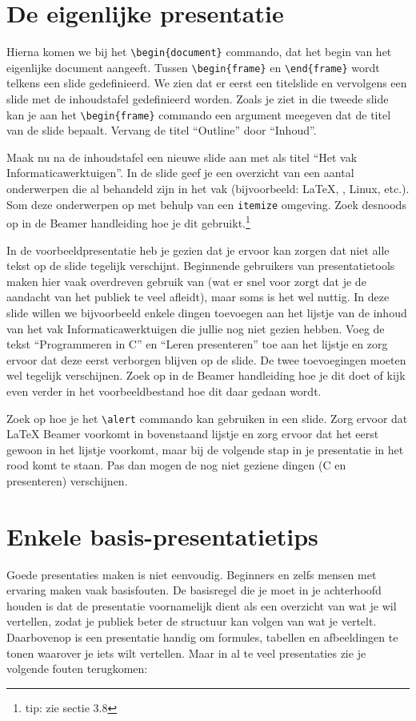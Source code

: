 \documentclass[a4paper,12pt]{article}
\begin{document}
\section{De eigenlijke presentatie}
Hierna komen we bij het \verb~\begin{document}~ commando, dat het
begin van het eigenlijke document aangeeft. Tussen
\verb~\begin{frame}~ en \verb~\end{frame}~ wordt telkens een slide
gedefinieerd. We zien dat er eerst een titelslide en vervolgens een
slide met de inhoudstafel gedefinieerd worden. Zoals je ziet in die
tweede slide kan je aan het \verb~\begin{frame}~ commando een
argument meegeven dat de titel van de slide bepaalt. Vervang de
titel ``Outline'' door ``Inhoud''.

Maak nu na de inhoudstafel een nieuwe slide aan met als titel ``Het
vak Informaticawerktuigen''. In de slide geef je een overzicht van een
aantal onderwerpen die al behandeld zijn in het vak (bijvoorbeeld:
\LaTeX{}, \BibTeX{}, Linux, etc.). Som deze onderwerpen op met
behulp van een \texttt{itemize} omgeving. Zoek desnoods op in de
Beamer handleiding hoe je dit gebruikt.\footnote{tip: zie sectie 3.8}

In de voorbeeldpresentatie heb je gezien dat je ervoor kan zorgen dat
niet alle tekst op de slide tegelijk verschijnt. Beginnende gebruikers
van presentatietools maken hier vaak overdreven gebruik van (wat er
snel voor zorgt dat je de aandacht van het publiek te veel afleidt),
maar soms is het wel nuttig. In deze slide willen we bijvoorbeeld
enkele dingen toevoegen aan het lijstje van de inhoud van het vak
Informaticawerktuigen die jullie nog niet gezien hebben. Voeg de tekst
``Programmeren in C'' en ``Leren presenteren'' toe aan
het lijstje en zorg ervoor dat deze eerst verborgen blijven op de
slide. De twee toevoegingen moeten wel tegelijk verschijnen. Zoek op
in de Beamer handleiding hoe je dit doet of kijk even verder in het
voorbeeldbestand hoe dit daar gedaan wordt.

Zoek op hoe je het \verb~\alert~ commando kan gebruiken in een slide.
Zorg ervoor dat \LaTeX{} Beamer voorkomt in bovenstaand lijstje en
zorg ervoor dat het eerst gewoon in het lijstje voorkomt, maar bij de
volgende stap in je presentatie in het rood komt te staan. Pas dan
mogen de nog niet geziene dingen (C en presenteren) verschijnen.

\section{Enkele basis-presentatietips}
Goede presentaties maken is niet eenvoudig. Beginners en zelfs
mensen met ervaring maken vaak basisfouten. De basisregel die je moet
in je achterhoofd houden is dat de presentatie voornamelijk dient als
een overzicht van wat je wil vertellen, zodat je publiek beter de
structuur kan volgen van wat je vertelt. Daarbovenop is een
presentatie handig om formules, tabellen en afbeeldingen te tonen
waarover je iets wilt vertellen. Maar in al te veel presentaties zie
je volgende fouten terugkomen:
\end{document}
